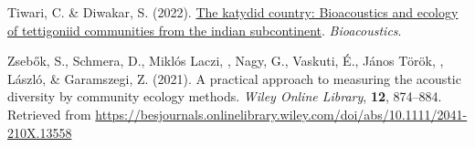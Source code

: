\documentclass[
]{article}
\newlength{\cslhangindent}
\newlength{\cslentryspacingunit} %
\newenvironment{CSLReferences}[2] %
 {%
  \setlength{\parindent}{0pt}
  \ifodd #1
  \let\oldpar\par
  \def\par{\hangindent=\cslhangindent\oldpar}
  \fi
  \setlength{\parskip}{#2\cslentryspacingunit}
 }%
 {}
\begin{document}
\begin{CSLReferences}{1}{0}
\leavevmode{}%
Tiwari, C. \& Diwakar, S. (2022).
\href{https://doi.org/10.1080/09524622.2022.2064330}{The katydid
country: Bioacoustics and ecology of tettigoniid communities from the
indian subcontinent}. \emph{Bioacoustics}.

\leavevmode{}%
Zsebők, S., Schmera, D., Miklós Laczi, \textbar, Nagy, G., Vaskuti, É.,
János Török, \textbar, László, \textbar{} \& Garamszegi, Z. (2021). A
practical approach to measuring the acoustic diversity by community
ecology methods. \emph{Wiley Online Library}, \textbf{12}, 874--884.
Retrieved from
\url{https://besjournals.onlinelibrary.wiley.com/doi/abs/10.1111/2041-210X.13558}

\end{CSLReferences}
\end{document}
